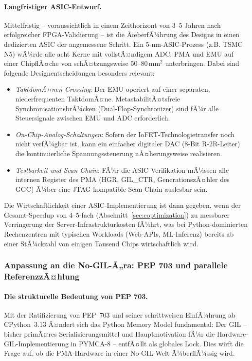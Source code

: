 ﻿\documentclass[a4paper,12pt]{scrreprt}
\theoremstyle{definition}
\begin{document}
	\paragraph{Langfristiger ASIC-Entwurf.}
	Mittelfristig -- voraussichtlich in einem Zeithorizont von 3--5 Jahren nach
	erfolgreicher FPGA-Validierung -- ist die ÃœberfÃ¼hrung des Designs in einen
	dedizierten ASIC der angemessene Schritt. Ein 5-nm-ASIC-Prozess (z.B. TSMC N5)
	wÃ¼rde alle acht Kerne mit vollstÃ¤ndigem ADC, PMA und EMU auf einer ChipflÃ¤che
	von schÃ¤tzungsweise $50$--$80\,\mathrm{mm}^2$ unterbringen. Dabei sind folgende
	Designentscheidungen besonders relevant:
	\begin{itemize}[noitemsep]
		\item \emph{TaktdomÃ¤nen-Crossing}: Der EMU operiert auf einer separaten,
		niederfrequenten TaktdomÃ¤ne. MetastabilitÃ¤tsfreie SynchronisationsbrÃ¼cken
		(Dual-Flop-Synchronizer) sind fÃ¼r alle Steuersignale zwischen EMU und ADC
		erforderlich.
		\item \emph{On-Chip-Analog-Schaltungen}: Sofern der IoFET-Technologietransfer
		noch nicht verfÃ¼gbar ist, kann ein einfacher digitaler DAC (8-Bit R-2R-Leiter)
		die kontinuierliche Spannungssteuerung nÃ¤herungsweise realisieren.
		\item \emph{Testbarkeit und Scan-Chain}: FÃ¼r die ASIC-Verifikation mÃ¼ssen
		alle internen Register des PMA (HGR, GIL\_CTR, GenerationszÃ¤hler des GGC)
		Ã¼ber eine JTAG-kompatible Scan-Chain auslesbar sein.
	\end{itemize}
	Die Wirtschaftlichkeit einer ASIC-Implementierung ist dann gegeben, wenn der
	Gesamt-Speedup von 4--5-fach (Abschnitt~\ref{sec:coptimization}) zu messbarer
	Verringerung der Server-Infrastrukturkos\-ten fÃ¼hrt, was bei Python-dominierten
	Rechenzentren mit typischen Workloads (Web-APIs, ML-Inferenz) bereits ab einer
	StÃ¼ckzahl von einigen Tausend Chips wirtschaftlich wird.

	\subsubsection{Anpassung an die No-GIL-Ã„ra: PEP 703 und parallele ReferenzzÃ¤hlung}

	\paragraph{Die strukturelle Bedeutung von PEP 703.}
	Mit der Ratifizierung von PEP~703 \cite{python_pep703} und seiner schrittweisen
	EinfÃ¼hrung ab CPython~3.13 Ã¤ndert sich das Python Memory Model fundamental:
	Der GIL -- bisher primÃ¤res Serialisierungsmittel und Hauptmotivation fÃ¼r die
	Hardware-GIL-Implementierung in PYMCA-8 -- entfÃ¤llt als globales Lock.
	Dies wirft die Frage auf, ob die PMA-Hardware in einer No-GIL-Welt Ã¼berflÃ¼ssig wird.
\end{document}
